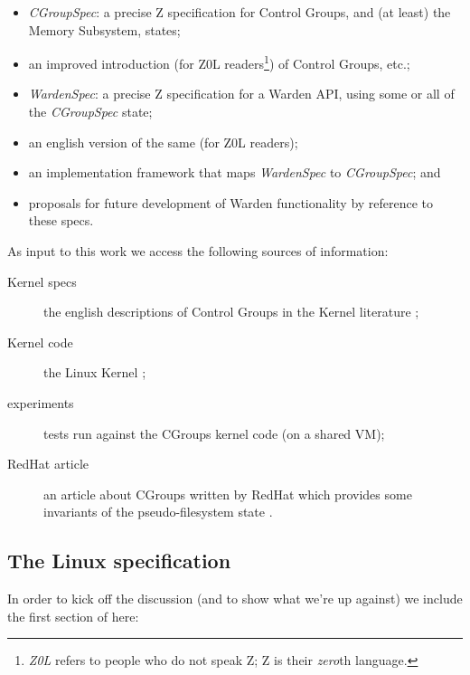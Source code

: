 \documentclass[a4paper,twoside,12pt]{article}
\begin{document}
\begin{itemize}
\item \emph{CGroupSpec}: a precise Z specification for Control Groups, and (at least) the Memory Subsystem, states;
\item an improved introduction (for Z0L readers\footnote{\emph{Z0L} refers to people who do not speak Z; Z is their \emph{zero}th language.}) of Control Groups, etc.;
\item \emph{WardenSpec}: a precise Z specification for a Warden API, using some or all of the \emph{CGroupSpec} state;
\item an english version of the same (for Z0L readers);
\item an implementation framework that maps \emph{WardenSpec} to \emph{CGroupSpec}; and
\item proposals for future development of Warden functionality by reference to these specs.
\end{itemize}
As input to this work we access the following sources of information:
\begin{description}
\item[Kernel specs] the english descriptions of Control Groups in the Kernel literature \cite{linuxgroups};
\item[Kernel code] the Linux Kernel \cite{linuxkernel};
\item[experiments] tests run against the CGroups kernel code (on a shared VM);
\item[RedHat article] an article about CGroups written by RedHat which provides some invariants of the pseudo-filesystem state \cite{rharticle}.
\end{description}

\subsection{The Linux specification \cite{linuxgroups}}

In order to kick off the discussion (and to show what we're up against) we include the first section of \cite{linuxgroups} here:
\end{document}
